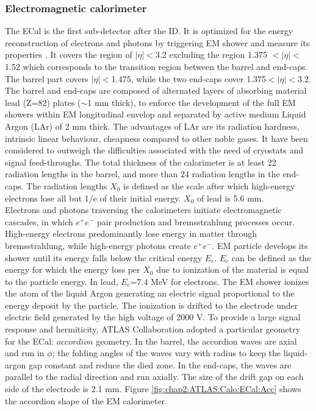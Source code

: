\subsubsection{Electromagnetic calorimeter}
\label{chap2:ATLAS:Calo:ECAL}
The ECal is the first sub-detector after the ID. It is optimized for the energy reconstruction of electrons and photons by triggering EM shower and measure its properties \cite{LAr_TRD}. It covers the region of $|\eta|<$3.2 excluding the region 1.375 $<|\eta|<$ 1.52 which corresponds to the transition region between the barrel and end-caps. The barrel part covers $|\eta|<$1.475, while the two end-caps cover 1.375$<|\eta|<$3.2. The barrel and end-caps are composed of alternated layers of absorbing material lead (Z=82) plates ($\sim$1 mm thick), to enforce the development of the full EM showers within EM longitudinal envelop and separated by active medium Liquid Argon (LAr) of 2 mm thick. The advantages of LAr are its radiation hardness, intrinsic linear behaviour, cheapness compared to other noble gases. It have been considered to outweigh the difficulties associated with the need of cryostats and signal feed-throughs. The total thickness of the calorimeter is at least 22 radiation lengths in the barrel, and more than 24 radiation lengths in the end-caps. The radiation lengths $X_0$ is defined as the scale after which high-energy electrons lose all but 1/e of their initial energy. $X_0$ of lead is 5.6 mm. \\
Electrons and photons traversing the calorimeters initiate electromagnetic cascades, in which $e^+e^-$ pair production and bremsstrahlung processes occur. High-energy electrons predominantly lose energy in matter through bremsstrahlung, while high-energy photons create $e^+e^-$. EM particle develops its shower until its energy falls below the critical energy $E_c$. $E_c$ can be defined as the energy for which the energy loss per $X_0$ due to ionization of the material is equal to the particle energy. In lead, $E_c$=7.4 MeV for electrons. The EM shower ionizes the atom of the liquid Argon generating an electric signal proportional to the energy deposit by the particle. The ionization is drifted to the electrode under electric field generated by the high voltage of 2000 V. To provide a large signal response and hermiticity, ATLAS Collaboration adopted a particular geometry for the ECal: $accordion$ geometry. In the barrel, the accordion waves are axial and run in $\phi$; the folding angles of the waves vary with radius to keep the liquid-argon gap constant and reduce the died zone. In the end-caps, the waves are parallel to the radial direction and run axially. The size of the drift gap on each side of the electrode is 2.1 mm. Figure \ref{fig:chap2:ATLAS:Calo:ECal:Acc} shows the accordion shape of the EM calorimeter.
